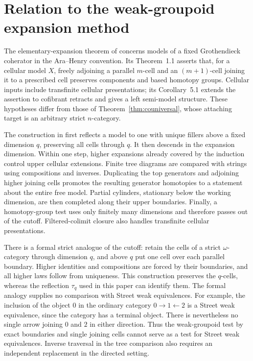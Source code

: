 \section{Relation to the weak-groupoid expansion method}
\label{sec:context}

The elementary-expansion theorem of \cite{OpenAI2026} concerns
models of a fixed Grothendieck coherator in the Ara--Henry convention.
Its Theorem~1.1 asserts that, for a cellular model \(X\), freely adjoining
a parallel \(m\)-cell and an \((m+1)\)-cell joining it to a prescribed
cell preserves components and based homotopy groups.  Cellular inputs
include transfinite cellular presentations; its Corollary~5.1 extends
the assertion to cofibrant retracts and gives a left semi-model
structure.  These hypotheses differ from those of
Theorem~\ref{thm:couniversal}, whose attaching target is an arbitrary
strict \(n\)-category.

The construction in \cite[Sections~3--4]{OpenAI2026}
first reflects a model to one with unique fillers above a fixed
dimension \(q\), preserving all cells through \(q\).  It then descends
in the expansion dimension.  Within one step, higher expansions
already covered by the induction control upper cellular extensions.
Finite tree diagrams are compared with strings using compositions
and inverses.  Duplicating the top generators and adjoining higher
joining cells promotes the resulting generator homotopies to a
statement about the entire free model.  Partial cylinders, stationary
below the working dimension, are then completed along their upper
boundaries.  Finally, a
homotopy-group test uses only finitely many dimensions and therefore
passes out of the cutoff.  Filtered-colimit closure also handles
transfinite cellular presentations.

There is a formal strict analogue of the cutoff: retain the cells of
a strict \(\omega\)-category through dimension \(q\), and above \(q\)
put one cell over each parallel boundary.  Higher identities and
compositions are forced by their boundaries, and all higher laws
follow from uniqueness.  This construction preserves the
\(q\)-cells, whereas the reflection \(\tau_q\) used in this paper
can identify them.  The formal analogy supplies no comparison with
Street weak equivalences.  For example, the inclusion of the object
\(0\) in the ordinary category \(0\longrightarrow1\longleftarrow2\)
is a Street weak equivalence, since the category has a terminal
object.  There is nevertheless no single arrow joining \(0\) and
\(2\) in either direction.  Thus the weak-groupoid test by exact
boundaries and single joining cells cannot serve as a test for
Street weak equivalences.  Inverse traversal in the tree comparison
also requires an independent replacement in the directed setting.


